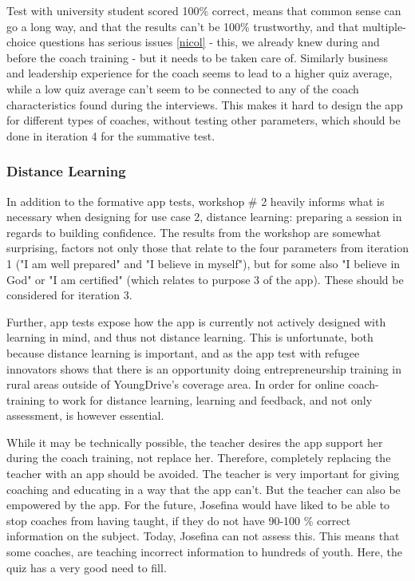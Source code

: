 Test with university student scored 100\% correct, means that common sense can go a long way, and that the results can't be 100\% trustworthy, and that multiple-choice questions has serious issues \ref{nicol} - this, we already knew during and before the coach training - but it needs to be taken care of. Similarly business and leadership experience for the coach seems to lead to a higher quiz average, while a low quiz average can't seem to be connected to any of the coach characteristics found during the interviews. This makes it hard to design the app for different types of coaches, without testing other parameters, which should be done in iteration 4 for the summative test.

\subsubsection{Distance Learning}
In addition to the formative app tests, workshop \# 2 heavily informs what is necessary when designing for use case 2, distance learning: preparing a session in regards to building confidence. The results from the workshop are somewhat surprising, factors not only those that relate to the four parameters from iteration 1 ("I am well prepared" and "I believe in myself"), but for some also "I believe in God" or "I am certified" (which relates to purpose 3 of the app). These should be considered for iteration 3.

Further, app tests expose how the app is currently not actively designed with learning in mind, and thus not distance learning. This is unfortunate, both because distance learning is important, and as the app test with refugee innovators shows that there is an opportunity doing entrepreneurship training in rural areas outside of YoungDrive's coverage area. In order for online coach-training to work for distance learning, learning and feedback, and not only assessment, is however essential.

While it may be technically possible, the teacher desires the app support her during the coach training, not replace her. Therefore, completely replacing the teacher with an app should be avoided. The teacher is very important for giving coaching and educating in a way that the app can't. But the teacher can also be empowered by the app. For the future, Josefina would have liked to be able to stop coaches from having taught, if they do not have 90-100 \% correct information on the subject. Today, Josefina can not assess this. This means that some coaches, are teaching incorrect information to hundreds of youth. Here, the quiz has a very good need to fill.

